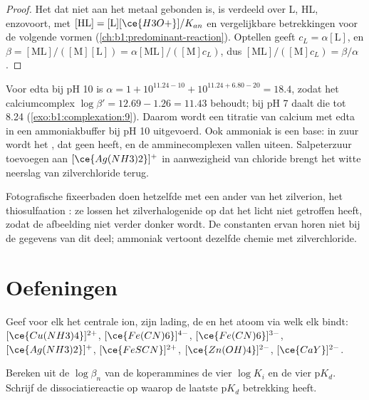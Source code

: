\begin{proof}
Het  dat niet aan het metaal gebonden is, is verdeeld over L, HL,
 enzovoort, met $[\mathrm{HL}] = [\mathrm{L}][\ce{H3O+}]/K_{an}$ en
vergelijkbare betrekkingen voor de volgende vormen
(\cref{ch:b1:predominant-reaction}). Optellen geeft $c_L = \alpha[\mathrm{L}]$,
en $\beta = [\mathrm{ML}]/([\mathrm{M}][\mathrm{L}]) =
\alpha[\mathrm{ML}]/([\mathrm{M}]c_L)$, dus $[\mathrm{ML}]/([\mathrm{M}]c_L)
= \beta/\alpha$.
\end{proof}

Voor edta bij pH 10 is $\alpha = 1 + 10^{11.24 - 10} + 10^{11.24 + 6.80 - 20}
= 18.4$, zodat het calciumcomplex $\log\beta' = 12.69 - 1.26 = 11.43$
behoudt; bij pH 7 daalt die tot 8.24 (\cref{exo:b1:complexation:9}).
Daarom wordt een titratie van calcium met edta in een ammoniakbuffer bij
pH 10 uitgevoerd. Ook ammoniak is een base: in zuur wordt het ,
dat geen  heeft, en de amminecomplexen vallen
uiteen. Salpeterzuur toevoegen aan $[\ce{Ag(NH3)2}]^{+}$ in aanwezigheid
van chloride brengt het witte neerslag van zilverchloride terug.

Fotografische fixeerbaden doen hetzelfde met een ander  van het
zilverion, het thiosulfaation : ze lossen het zilverhalogenide
op dat het licht niet getroffen heeft, zodat de afbeelding niet verder
donker wordt. De constanten ervan horen niet bij de gegevens van dit
deel; ammoniak vertoont dezelfde chemie met zilverchloride.

\section{Oefeningen}

\begin{exercise}[$\star$]\label{exo:b1:complexation:1}
Geef voor elk  het centrale ion, zijn lading, de  en het
atoom via welk elk  bindt: $[\ce{Cu(NH3)4}]^{2+}$,
$[\ce{Fe(CN)6}]^{4-}$, $[\ce{Fe(CN)6}]^{3-}$, $[\ce{Ag(NH3)2}]^{+}$,
$[\ce{FeSCN}]^{2+}$, $[\ce{Zn(OH)4}]^{2-}$, $[\ce{CaY}]^{2-}$.
\end{exercise}

\begin{exercise}[$\star$]\label{exo:b1:complexation:2}
Bereken uit de $\log\beta_n$ van de koperammines de vier $\log K_i$ en de
vier $\mathrm{p}K_d$. Schrijf de dissociatiereactie op waarop de laatste
$\mathrm{p}K_d$ betrekking heeft.
\end{exercise}

